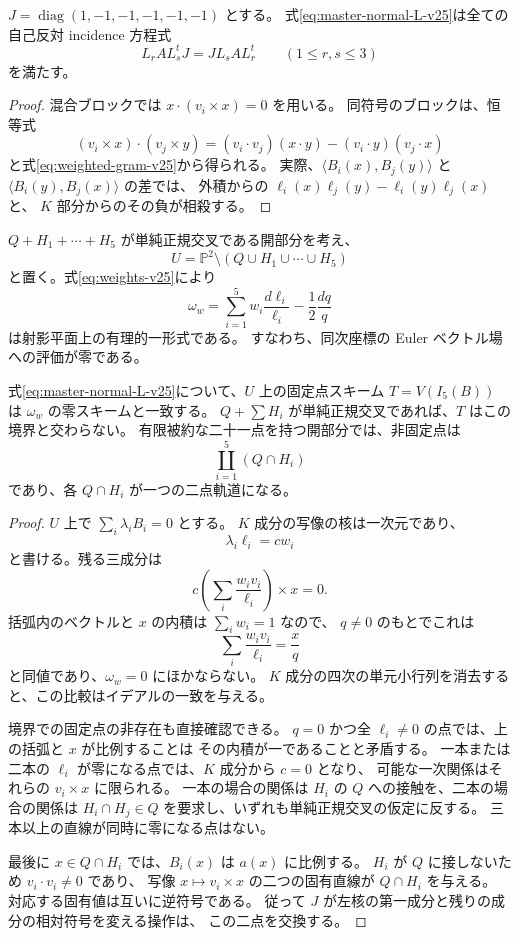 \begin{proposition}[重み付き直線からの自己反対関係]
\label{prop:master-incidence-v25}
$J=\operatorname{diag}(1,-1,-1,-1,-1,-1)$ とする。
式\eqref{eq:master-normal-L-v25}は全ての自己反対 incidence 方程式
\[
 L_r A L_s^t J=J L_s A L_r^t\qquad(1\le r,s\le3)
\]
を満たす。
\end{proposition}
\begin{proof}
混合ブロックでは $x\cdot(v_i\times x)=0$ を用いる。
同符号のブロックは、恒等式
\[
 (v_i\times x)\cdot(v_j\times y)
  =(v_i\cdot v_j)(x\cdot y)-(v_i\cdot y)(v_j\cdot x)
\]
と式\eqref{eq:weighted-gram-v25}から得られる。
実際、$\langle B_i(x),B_j(y)\rangle$
と $\langle B_i(y),B_j(x)\rangle$ の差では、
外積からの
$\ell_i(x)\ell_j(y)-\ell_i(y)\ell_j(x)$ と、
$K$ 部分からのその負が相殺する。
\end{proof}

$Q+H_1+\cdots+H_5$ が単純正規交叉である開部分を考え、
\[
 U=\mathbb P^2\setminus(Q\cup H_1\cup\cdots\cup H_5)
\]
と置く。式\eqref{eq:weights-v25}により
\begin{equation}\label{eq:master-log-form-v25}
 \omega_w=\sum_{i=1}^5w_i\frac{d\ell_i}{\ell_i}
                -\frac12\frac{dq}{q}
\end{equation}
は射影平面上の有理的一形式である。
すなわち、同次座標の Euler ベクトル場への評価が零である。

\begin{proposition}[固定点の対数的表示]
\label{prop:master-critical-fixed-v25}
式\eqref{eq:master-normal-L-v25}について、$U$ 上の固定点スキーム
$T=V(I_5(B))$ は $\omega_w$ の零スキームと一致する。
$Q+\sum H_i$ が単純正規交叉であれば、$T$ はこの境界と交わらない。
有限被約な二十一点を持つ開部分では、非固定点は
\[
 \coprod_{i=1}^5 (Q\cap H_i)
\]
であり、各 $Q\cap H_i$ が一つの二点軌道になる。
\end{proposition}
\begin{proof}
$U$ 上で $\sum_i\lambda_i B_i=0$ とする。
$K$ 成分の写像の核は一次元であり、
\[
 \lambda_i\ell_i=cw_i
\]
と書ける。残る三成分は
\[
 c\left(\sum_i\frac{w_i v_i}{\ell_i}\right)\times x=0.
\]
括弧内のベクトルと $x$ の内積は $\sum_iw_i=1$ なので、
$q\ne0$ のもとでこれは
\[
 \sum_i\frac{w_i v_i}{\ell_i}=\frac{x}{q}
\]
と同値であり、$\omega_w=0$ にほかならない。
$K$ 成分の四次の単元小行列を消去すると、この比較はイデアルの一致を与える。

境界での固定点の非存在も直接確認できる。
$q=0$ かつ全 $\ell_i\ne0$ の点では、上の括弧と $x$ が比例することは
その内積が一であることと矛盾する。
一本または二本の $\ell_i$ が零になる点では、$K$ 成分から $c=0$ となり、
可能な一次関係はそれらの $v_i\times x$ に限られる。
一本の場合の関係は $H_i$ の $Q$ への接触を、二本の場合の関係は
$H_i\cap H_j\in Q$ を要求し、いずれも単純正規交叉の仮定に反する。
三本以上の直線が同時に零になる点はない。

最後に $x\in Q\cap H_i$ では、$B_i(x)$ は $a(x)$ に比例する。
$H_i$ が $Q$ に接しないため $v_i\cdot v_i\ne0$ であり、
写像 $x\mapsto v_i\times x$ の二つの固有直線が $Q\cap H_i$ を与える。
対応する固有値は互いに逆符号である。
従って $J$ が左核の第一成分と残りの成分の相対符号を変える操作は、
この二点を交換する。
\end{proof}

